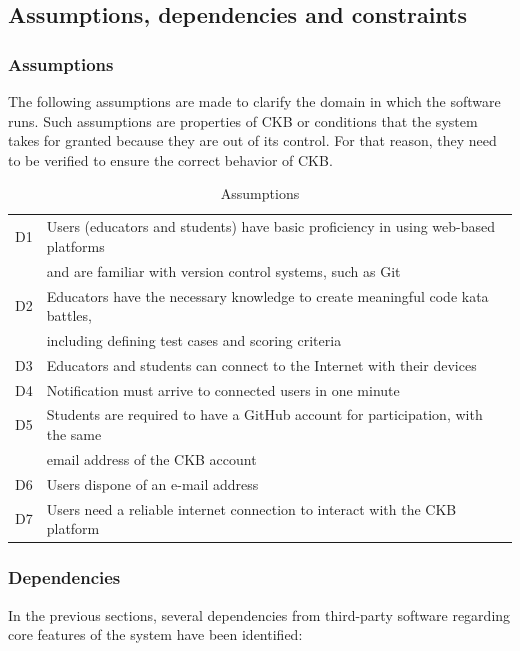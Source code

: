 \newpage

\subsection {Assumptions, dependencies and constraints}

\subsubsection{Assumptions}
The following assumptions are made to clarify the domain in which the software runs. Such assumptions are properties of CKB or conditions that the system takes for granted because they are out of its control. For that reason, they need to be verified to ensure the correct behavior of CKB.

\begin{table}[h]
    \centering
    \begin{tabular}{|l|l|}
    \hline
        D1 & Users (educators and students) have basic proficiency in using web-based platforms \\
        & and are familiar with version control systems, such as Git\\
    \hline
        D2 & Educators have the necessary knowledge to create meaningful code kata battles,\\ 
        & including defining test cases and scoring criteria \\
    \hline
        D3 & Educators and students can connect to the Internet with their devices \\
    \hline
        D4 & Notification must arrive to connected users in one minute \\
    \hline
        D5 & Students are required to have a GitHub account for participation, with the same \\ & email address of the CKB account \\
    \hline
        D6 & Users dispone of an e-mail address \\
    \hline
        D7 & Users need a reliable internet connection to interact with the CKB platform\\
    \hline
    \end{tabular}
    \caption{Assumptions}
    \label{tab:assumptions}
\end{table}

\subsubsection{Dependencies}
In the previous sections, several dependencies from third-party software regarding core features of the system have been identified:

